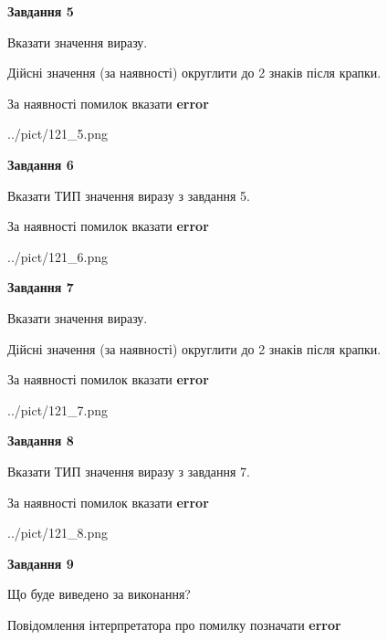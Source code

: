\documentclass[11pt, ukrainian]{article}
\begin{document}
{\begin {large}
{\begin {center}\textbf{Завдання 5}\end {center}}\par
Вказати значення виразу. \par
Дійсні значення (за наявності) округлити до 2 знаків після крапки. \par
За наявності помилок вказати \textbf{error}

\begin{center}
	{../pict/121_5.png}
\end{center}
\newpage

{\begin {center}\textbf{Завдання 6}\end {center}}\par
Вказати ТИП значення виразу з завдання 5. \par
За наявності помилок вказати \textbf{error}

\begin{center}
	{../pict/121_6.png}
\end{center}
\newpage

{\begin {center}\textbf{Завдання 7}\end {center}}\par
Вказати значення виразу. \par
Дійсні значення (за наявності) округлити до 2 знаків після крапки. \par
За наявності помилок вказати \textbf{error}

\begin{center}
	{../pict/121_7.png}
\end{center}
\newpage

{\begin {center}\textbf{Завдання 8}\end {center}}\par
Вказати ТИП значення виразу з завдання 7. \par
За наявності помилок вказати \textbf{error}

\begin{center}
	{../pict/121_8.png}
\end{center}
\newpage

{\begin {center}\textbf{Завдання 9}\end {center}}\par
Що буде виведено за виконання? \par
Повідомлення інтерпретатора про помилку позначати \textbf{error}


\end{large}}
\end{document}
